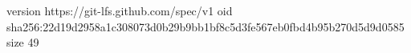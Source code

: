 version https://git-lfs.github.com/spec/v1
oid sha256:22d19d2958a1c308073d0b29b9bb1bf8c5d3fe567eb0fbd4b95b270d5d9d0585
size 49
